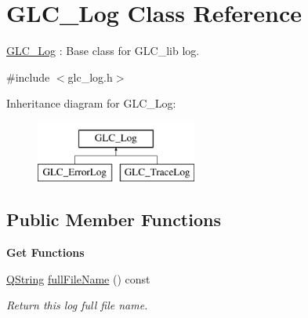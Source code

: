 \hypertarget{class_g_l_c___log}{\section{G\-L\-C\-\_\-\-Log Class Reference}
\label{class_g_l_c___log}
}


\hyperlink{class_g_l_c___log}{G\-L\-C\-\_\-\-Log} \-: Base class for G\-L\-C\-\_\-lib log.  




{\ttfamily \#include $<$glc\-\_\-log.\-h$>$}

Inheritance diagram for G\-L\-C\-\_\-\-Log\-:\begin{figure}[H]
\begin{center}
\leavevmode
\includegraphics[height=2.000000cm]{class_g_l_c___log}
\end{center}
\end{figure}
\subsection*{Public Member Functions}
\begin{Indent}{\bf Get Functions}\par
\begin{DoxyCompactItemize}
\item 
\hyperlink{group___u_a_v_objects_plugin_gab9d252f49c333c94a72f97ce3105a32d}{Q\-String} \hyperlink{class_g_l_c___log_aa804df84b873b52ec5d8e262614ae985}{full\-File\-Name} () const 
\begin{DoxyCompactList}\small\item\em Return this log full file name. \end{DoxyCompactList}\end{DoxyCompactItemize}
\end{Indent}

